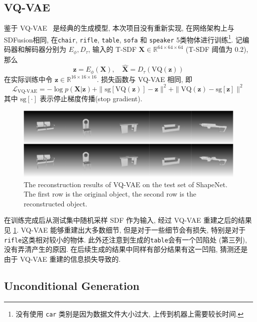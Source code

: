 \documentclass[11pt]{article}
\newcommand\1{\mathds{1}}
\newcommand\R{\mathbb{R}}
\begin{document}
\subsection{VQ-VAE}
鉴于 VQ-VAE~\cite{VQ-VAE} 是经典的生成模型, 本次项目没有重新实现, 在网络架构上与 SDFusion相同, 在\texttt{chair}, \texttt{rifle}, \texttt{table}, \texttt{sofa} 和 \texttt{speaker} 5类物体进行训练\footnote{没有使用 \texttt{car} 类别是因为数据文件大小过大, 上传到机器上需要较长时间.}. 
记编码器和解码器分别为 $E_\phi, D_{\tau}$, 输入的 T-SDF $\mathbf{X} \in \R^{64\times 64 \times 64}$ (T-SDF 阈值为 $0.2$), 那么
\begin{equation}
    \mathbf{z} = E_\phi(\mathbf{X}), \quad \hat{\mathbf{X}} = D_\tau(\text{VQ}(\mathbf{z}))
\end{equation}
在实际训练中令 $\mathbf{z} \in \R^{16\times 16\times 16}$. 损失函数与 VQ-VAE 相同, 即
\begin{equation}
    \mathcal{L}_{\text{VQ-VAE}} = -\log p(\mathbf{X}|\mathbf{z}) + \|\text{sg}[\text{VQ}(\mathbf{z})] - \mathbf{z}\|^2 + \|\text{VQ}(\mathbf{z}) - \text{sg}[\mathbf{z}]\|^2
\end{equation}
其中 $\text{sg}[\cdot]$ 表示停止梯度传播(stop gradient).

\begin{figure}[htbp]
    \centering
    \includegraphics[width=1.0\textwidth]{imgs/vqvae.pdf}
    \caption{The reconstruction results of VQ-VAE on the test set of ShapeNet. The first row is the original object, the second row is the reconstructed object.}
    \label{fig:reconstruction_vqvae}
\end{figure}

在训练完成后从测试集中随机采样 SDF 作为输入, 经过 VQ-VAE 重建之后的结果见 \cref{fig:reconstruction_vqvae}. VQ-VAE 能够重建出大多数细节, 但是对于一些细节会有损失, 特别是对于\texttt{rifle}这类相对较小的物体. 
此外还注意到生成的\texttt{table}会有一个凹陷处 (第三列), 没有弄清产生的原因. 在后续生成的结果中同样有部分结果有这一凹陷, 猜测还是由于 VQ-VAE 重建的信息损失导致的.

\subsection{Unconditional Generation}
\end{document}
